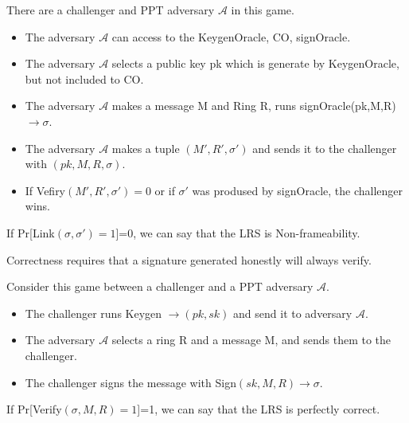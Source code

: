    \begin{definition}  There are a challenger and PPT adversary $\mathcal A $ in this game.
    
    \begin{itemize}
        \item The adversary $\mathcal A $ can access to the KeygenOracle, CO, signOracle.
        \item The adversary $\mathcal A $ selects a public key pk which is generate by KeygenOracle, but not included to CO.
        \item The adversary $\mathcal A $ makes a message M and Ring R, runs signOracle(pk,M,R)$\rightarrow \sigma$.
        \item The adversary $\mathcal A $ makes a tuple $(M',R',\sigma ')$ and sends it to the challenger with $(pk,M,R,\sigma)$.
        \item If Vefiry$(M',R',\sigma ')=0$ or if $\sigma'$ was prodused by signOracle, the challenger wins.
    \end{itemize}
    If Pr[Link$(\sigma, \sigma')=1$]=0, we can say that the LRS is Non-frameability.
    \end{definition}
    
    Correctness requires that a signature generated honestly will always verify.
    
    \begin{definition}[Correctness]  Consider this game between a challenger and a PPT adversary $\mathcal A $.
    
    \begin{itemize}
        \item The challenger runs Keygen $\rightarrow (pk,sk)$ and send it to adversary $\mathcal A $.
        \item The adversary $\mathcal A $ selects a ring R and a message M, and sends them to the challenger.
        \item The challenger signs the message with Sign$(sk,M,R) \rightarrow \sigma$.
    \end{itemize}
    If Pr[Verify$(\sigma,M,R)=1$]=1, we can say that the LRS is perfectly correct.
    \end{definition}
    

